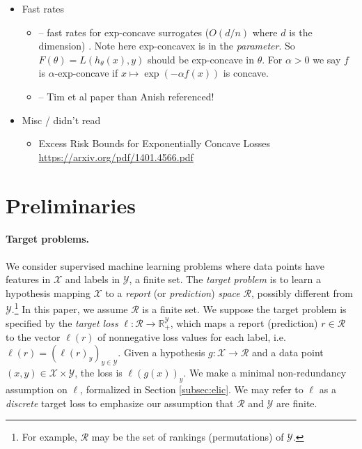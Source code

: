\documentclass{article}
\theoremstyle{definition}\newtheorem{definition}{Definition}
\theoremstyle{definition}\newtheorem{assumption}{Assumption}
\newcommand{\reals}{\mathbb{R}}
\newcommand{\R}{\mathcal{R}}
\newcommand{\X}{\mathcal{X}}
\newcommand{\Y}{\mathcal{Y}}
\begin{document}
\begin{itemize}
\item Fast rates
  \begin{itemize}
  \item \citet{koren2015fast} -- fast rates for exp-concave surrogates ($O(d/n)$ where $d$ is the dimension) .  Note here exp-concavex is in the \emph{parameter}.  So $F(\theta) = L(h_\theta(x),y)$ should be exp-concave in $\theta$.  For $\alpha>0$ we say $f$ is $\alpha$-exp-concave if $x \mapsto \exp(-\alpha f(x))$ is concave.
  \item \citet{grunwald2015fast} -- Tim et al paper than Anish referenced!  
  \end{itemize}
  
\item Misc / didn't read
  \begin{itemize}
  \item Excess Risk Bounds for Exponentially Concave Losses \url{https://arxiv.org/pdf/1401.4566.pdf}
  \end{itemize}
\end{itemize}



\section{Preliminaries}


\paragraph{Target problems.}
We consider supervised machine learning problems where data points have features in $\X$ and labels in $\Y$, a finite set.
The \emph{target problem} is to learn a hypothesis mapping $\X$ to a \emph{report} (or \emph{prediction}) \emph{space} $\R$, possibly different from $\Y$.\footnote{For example, $\R$ may be the set of rankings (permutations) of $\Y$.}
In this paper, we assume $\R$ is a finite set.
We suppose the target problem is specified by the \emph{target loss} $\ell:\R\to\reals^\Y_+$, which maps a report (prediction) $r \in \R$ to the vector $\ell(r)$ of nonnegative loss values for each label, i.e. $\ell(r) = (\ell(r)_y)_{y\in\Y}$.
Given a hypothesis $g: \X \to \R$ and a data point $(x,y) \in \X \times \Y$, the loss is $\ell(g(x))_y$.
We make a minimal non-redundancy assumption on $\ell$, formalized in Section \ref{subsec:elic}.
We may refer to $\ell$ as a \emph{discrete} target loss to emphasize our assumption that $\R$ and $\Y$ are finite.
\end{document}
